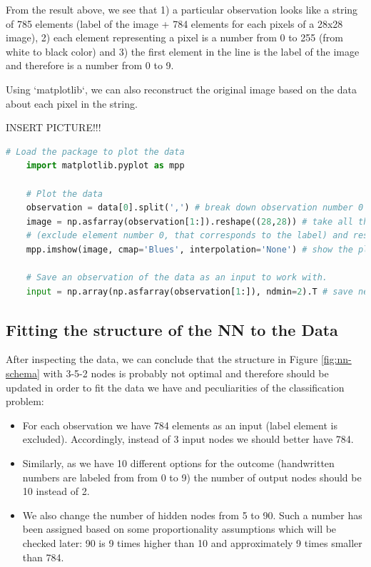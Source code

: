 From the result above, we see that 1) a particular observation looks like a string of 785 elements (label of the image + 784 elements for each pixels of a 28x28 image), 2) each element representing a pixel is a number from 0 to 255 (from white to black color) and 3) the first element in the line is the label of the image and therefore is a number from 0 to 9.

Using `matplotlib`, we can also reconstruct the original image based on the data about each pixel in the string.

INSERT PICTURE!!!

\begin{lstlisting}[language=Python]
    # Load the package to plot the data
    import matplotlib.pyplot as mpp

    # Plot the data
    observation = data[0].split(',') # break down observation number 0 (comma is used to identify each element).
    image = np.asfarray(observation[1:]).reshape((28,28)) # take all the elements starting from the element 1 
    # (exclude element number 0, that corresponds to the label) and reshape them as an array with dimension 28 by 28.
    mpp.imshow(image, cmap='Blues', interpolation='None') # show the plot of this array using blue pallete.

    # Save an observation of the data as an input to work with.
    input = np.array(np.asfarray(observation[1:]), ndmin=2).T # save necessary elements in a vertical vector shape.
\end{lstlisting}


\subsection{Fitting the structure of the NN to the Data}

After inspecting the data, we can conclude that the structure in Figure \ref{fig:nn-schema} with 3-5-2 nodes is probably not optimal and therefore should be updated in order to fit the data we have and peculiarities of the classification problem: 

\begin{itemize}
    \item For each observation we have 784 elements as an input (label element is excluded). Accordingly, instead of 3 input nodes we should better have 784.
    \item Similarly, as we have 10 different options for the outcome (handwritten numbers are labeled from from 0 to 9) the number of output nodes should be 10 instead of 2. 
    \item We also change the number of hidden nodes from 5 to 90. Such a number has been assigned based on some proportionality assumptions which will be checked later: 90 is 9 times higher than 10 and approximately 9 times smaller than 784.
\end{itemize}

